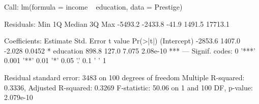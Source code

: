 \begin{Schunk}
\begin{Soutput}
Call:
lm(formula = income ~ education, data = Prestige)

Residuals:
    Min      1Q  Median      3Q     Max 
-5493.2 -2433.8   -41.9  1491.5 17713.1 

Coefficients:
            Estimate Std. Error t value Pr(>|t|)    
(Intercept)  -2853.6     1407.0  -2.028   0.0452 *  
education      898.8      127.0   7.075 2.08e-10 ***
---
Signif. codes:  0 '***' 0.001 '**' 0.01 '*' 0.05 '.' 0.1 ' ' 1

Residual standard error: 3483 on 100 degrees of freedom
Multiple R-squared:  0.3336,	Adjusted R-squared:  0.3269 
F-statistic: 50.06 on 1 and 100 DF,  p-value: 2.079e-10
\end{Soutput}
\end{Schunk}
